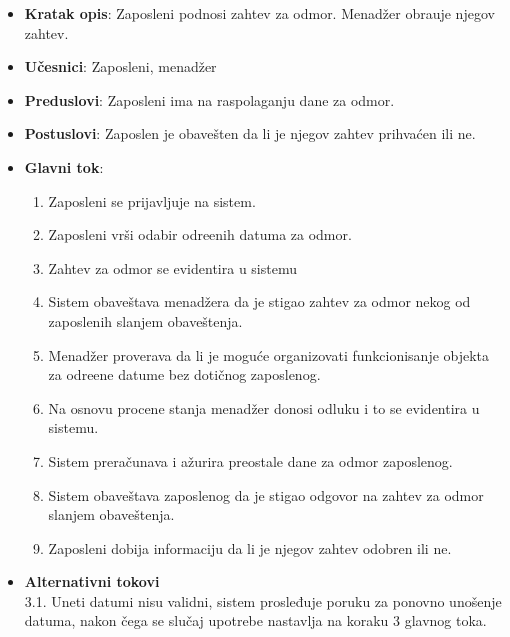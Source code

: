  \begin{itemize}
    \item \textbf{Kratak opis}:
   Zaposleni podnosi zahtev za odmor. Menad\v zer obra\dj uje njegov zahtev.
    \item \textbf{Učesnici}:
    Zaposleni, menad\v zer
    \item \textbf{Preduslovi}: Zaposleni ima na raspolaganju dane za odmor.
    \item \textbf{Postuslovi}:
    Zaposlen je obave\v sten da li je njegov zahtev prihva\'cen ili ne.
    \item \textbf{Glavni tok}:
    \begin{enumerate}
        \item Zaposleni se prijavljuje na sistem.
        \item Zaposleni vr\v si odabir odre\dj enih datuma za odmor.
        \item Zahtev za odmor se evidentira u sistemu 
        \item Sistem obave\v stava menad\v zera da je stigao zahtev za odmor nekog od zaposlenih slanjem obaveštenja.
        \item Menad\v zer proverava da li je moguće organizovati funkcionisanje objekta za odre\dj ene datume bez dotičnog zaposlenog.
        \item Na osnovu procene stanja menad\v zer donosi odluku i to se evidentira u sistemu.
        \item Sistem prera\v cunava i a\v zurira preostale dane za odmor zaposlenog.
        \item Sistem obave\v stava zaposlenog da je stigao odgovor na zahtev za odmor slanjem obaveštenja.
        \item Zaposleni dobija informaciju da li je njegov zahtev odobren ili ne.
    \end{enumerate}
\item \textbf{Alternativni tokovi}\\
        3.1. Uneti datumi nisu validni, sistem prosleđuje poruku za ponovno unošenje datuma, nakon čega se slučaj upotrebe nastavlja na koraku 3 glavnog toka.

 \end{itemize}
 
